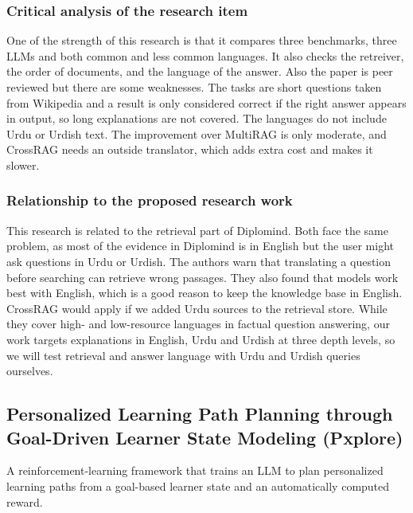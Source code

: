 \documentclass{FastFyp}
\begin{document}
\subsubsection{Critical analysis of the research item}
One of the strength of this research is that it compares three benchmarks, three LLMs and both common and less common languages. It also checks the retreiver, the order of documents, and the language of the answer. Also the paper is peer reviewed but there are some weaknesses. The tasks are short questions taken from Wikipedia and a result is only considered correct if the right answer appears in output, so long explanations are not covered. The languages do not include Urdu or Urdish text. The improvement over MultiRAG is only moderate, and CrossRAG needs an outside translator, which adds extra cost and makes it slower.


\subsubsection{Relationship to the proposed research work}
This research is related to the retrieval part of Diplomind. Both face the same problem, as most of the evidence in Diplomind is in English but the user might ask questions in Urdu or Urdish. The authors warn that translating a question before searching can retrieve wrong passages. They also found that models work best with English, which is a good reason to keep the knowledge base in English. CrossRAG would apply if we added Urdu sources to the retrieval store. While they cover high- and low-resource languages in factual question answering, our work targets explanations in English, Urdu and Urdish at three depth levels, so we will test retrieval and answer language with Urdu and Urdish queries ourselves.




\subsection{Personalized Learning Path Planning through Goal-Driven Learner State Modeling (Pxplore)}
A reinforcement-learning framework that trains an LLM to plan personalized learning paths from a goal-based learner state and an automatically computed reward.
\end{document}
